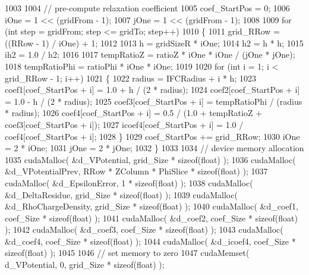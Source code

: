 \begin{DoxyCode}
1003 
1004     \textcolor{comment}{// pre-compute relaxation coefficient}
1005     coef\_StartPos = 0;
1006     iOne = 1 << (gridFrom - 1); 
1007     jOne = 1 << (gridFrom - 1);
1008     
1009     \textcolor{keywordflow}{for} (\textcolor{keywordtype}{int} step = gridFrom; step <= gridTo; step++)
1010     \{
1011         grid\_RRow = ((RRow - 1) / iOne) + 1;
1012 
1013         h = gridSizeR * iOne;
1014         h2 = h * h;
1015         ih2 = 1.0 / h2;
1016 
1017         tempRatioZ = ratioZ * iOne * iOne / (jOne * jOne);
1018         tempRatioPhi = ratioPhi * iOne * iOne;
1019 
1020         \textcolor{keywordflow}{for} (\textcolor{keywordtype}{int} i = 1; i < grid\_RRow - 1; i++)
1021         \{
1022             radius = IFCRadius + i * h;
1023             coef1[coef\_StartPos + i] = 1.0 + h / (2 * radius);
1024             coef2[coef\_StartPos + i] = 1.0 - h / (2 * radius);
1025             coef3[coef\_StartPos + i] = tempRatioPhi / (radius * radius);
1026             coef4[coef\_StartPos + i] = 0.5 / (1.0 + tempRatioZ + coef3[coef\_StartPos + i]);
1027             icoef4[coef\_StartPos + i] = 1.0 / coef4[coef\_StartPos + i];
1028         \}
1029         coef\_StartPos += grid\_RRow;
1030         iOne = 2 * iOne;
1031         jOne = 2 * jOne;
1032     \}
1033 
1034     \textcolor{comment}{// device memory allocation}
1035     cudaMalloc( &d\_VPotential, grid\_Size * \textcolor{keyword}{sizeof}(\textcolor{keywordtype}{float}) );
1036     cudaMalloc( &d\_VPotentialPrev, RRow * ZColumn * PhiSlice * \textcolor{keyword}{sizeof}(\textcolor{keywordtype}{float}) );
1037     cudaMalloc( &d\_EpsilonError, 1 * \textcolor{keyword}{sizeof}(\textcolor{keywordtype}{float}) );   
1038     cudaMalloc( &d\_DeltaResidue, grid\_Size * \textcolor{keyword}{sizeof}(\textcolor{keywordtype}{float}) );
1039     cudaMalloc( &d\_RhoChargeDensity, grid\_Size * \textcolor{keyword}{sizeof}(\textcolor{keywordtype}{float}) );
1040     cudaMalloc( &d\_coef1, coef\_Size * \textcolor{keyword}{sizeof}(\textcolor{keywordtype}{float}) );
1041     cudaMalloc( &d\_coef2, coef\_Size * \textcolor{keyword}{sizeof}(\textcolor{keywordtype}{float}) );
1042     cudaMalloc( &d\_coef3, coef\_Size * \textcolor{keyword}{sizeof}(\textcolor{keywordtype}{float}) );
1043     cudaMalloc( &d\_coef4, coef\_Size * \textcolor{keyword}{sizeof}(\textcolor{keywordtype}{float}) );
1044     cudaMalloc( &d\_icoef4, coef\_Size * \textcolor{keyword}{sizeof}(\textcolor{keywordtype}{float}) );
1045 
1046     \textcolor{comment}{// set memory to zero}
1047     cudaMemset( d\_VPotential, 0, grid\_Size * \textcolor{keyword}{sizeof}(\textcolor{keywordtype}{float}) );

\end{DoxyCode}
